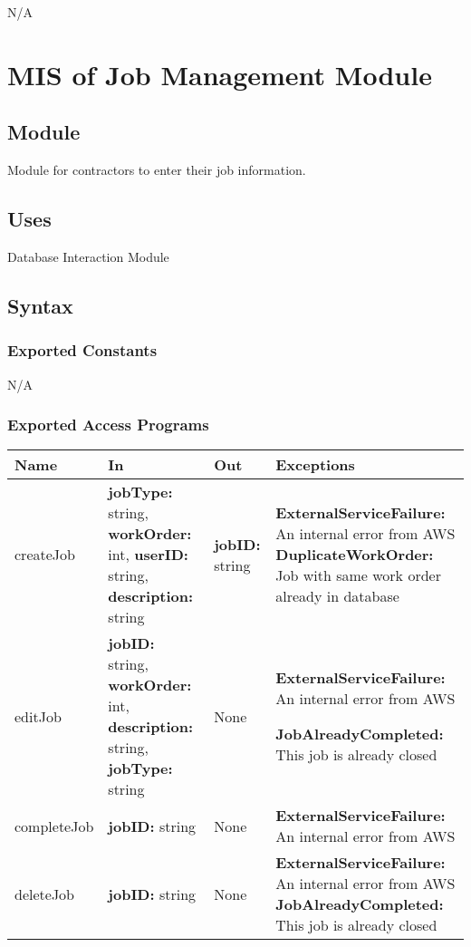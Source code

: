 \documentclass[12pt, titlepage]{article}
\begin{document}
N/A

\section{MIS of Job Management Module} \label{Module}

\subsection{Module}

Module for contractors to enter their job information.

\subsection{Uses}
Database Interaction Module
\subsection{Syntax}

\subsubsection{Exported Constants}
N/A
\subsubsection{Exported Access Programs}

\begin{center}
  \begin{tabular}{>{\raggedright}p{2cm} >{\raggedright}p{5cm}
    >{\raggedright}p{3cm} p{3cm}}
    \hline
    \textbf{Name} & \textbf{In} & \textbf{Out} & \textbf{Exceptions} \\
    \hline
    createJob & \textbf{jobType:} string, \textbf{workOrder:} int,
    \textbf{userID:} string, \textbf{description:} string &
    \textbf{jobID:} string &  \textbf{ExternalServiceFailure:} An
    internal error from AWS \newline
    \textbf{DuplicateWorkOrder:} Job with same work order already in database \\
    \hline
    editJob & \textbf{jobID:} string, \textbf{workOrder:} int,
    \textbf{description:} string, \textbf{jobType:} string & None &
    \textbf{ExternalServiceFailure:} An internal error from AWS \newline

    \textbf{JobAlreadyCompleted:} This job is already closed\\
    \hline
    completeJob & \textbf{jobID:} string & None &
    \textbf{ExternalServiceFailure:} An internal error from AWS\\
    \hline
    deleteJob & \textbf{jobID:} string & None &
    \textbf{ExternalServiceFailure:} An internal error from AWS \newline
    \textbf{JobAlreadyCompleted:} This job is already closed\\
    \hline
  \end{tabular}
\end{center}
\end{document}
